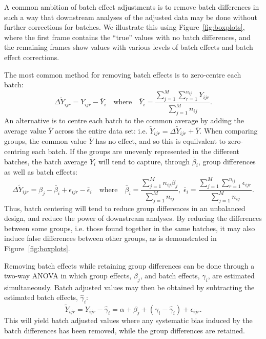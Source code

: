 \documentclass{bio}
\begin{document}
A common ambition of batch effect adjustments is to remove batch differences in such a way that downstream analyses of the adjusted data may be done without further corrections for batches. We illustrate this using Figure~\ref{fig:boxplots}, where the first frame contains the ``true'' values with no batch differences, and the remaining frames show values with various levels of batch effects and batch effect corrections.

The most common method for removing batch effects is to zero-centre each batch:
\begin{equation}
\Delta\widetilde Y_{ijr}=Y_{ijr}-\bar{Y}_{i}
\quad\text{where}\quad
\bar{Y}_i=\frac{\sum_{j=1}^M\sum_{r=1}^{n_{ij}} Y_{ijr}}{\sum_{j=1}^M n_{ij}}.
\end{equation}
An alternative is to centre each batch to the common average by adding the average value $\bar{Y}$ across the entire data set: i.e. $\widetilde Y_{ijr}=\Delta\widetilde Y_{ijr}+\bar{Y}$. When comparing groups, the common value $\bar{Y}$ has no effect, and so this is equilvalent to zero-centring each batch. If the groups are unevenly represented in the different batches, the batch average $\bar{Y}_i$ will tend to capture, through $\bar\beta_i$, group differences as well as batch effects:
\begin{equation}
\Delta\widetilde{Y}_{ijr}=\beta_j-\bar{\beta}_i+\epsilon_{ijr}-\bar{\epsilon}_i
\quad\text{where}\quad
\bar{\beta}_i=\frac{\sum_{j=1}^M n_{ij}\beta_j}{\sum_{j=1}^M n_{ij}},\;
\bar{\epsilon}_i=\frac{\sum_{j=1}^M\sum_{r=1}^{n_{ij}} \epsilon_{ijr}}{\sum_{j=1}^M n_{ij}}.
\end{equation}
Thus, batch centering will tend to reduce group differences in an unbalanced design, and reduce the power of downstream analyses. By reducing the differences between some groups, i.e. those found together in the same batches, it may also induce false differences between other groups, as is demonstrated in Figure~\ref{fig:boxplots}.

Removing batch effects while retaining group differences can be done through a two-way ANOVA in which group effects, $\beta_j$, and batch effects, $\gamma_i$, are estimated simultaneously. Batch adjusted values may then be obtained by subtracting the estimated batch effects, $\hat\gamma_i$:
\begin{equation}
\widetilde Y_{ijr}=Y_{ijr}-\hat\gamma_i=\alpha+\beta_j+(\gamma_i-\hat\gamma_i)+\epsilon_{ijr}.
\end{equation}
This will yield batch adjusted values where any systematic bias induced by the batch differences has been removed, while the group differences are retained.
\end{document}
